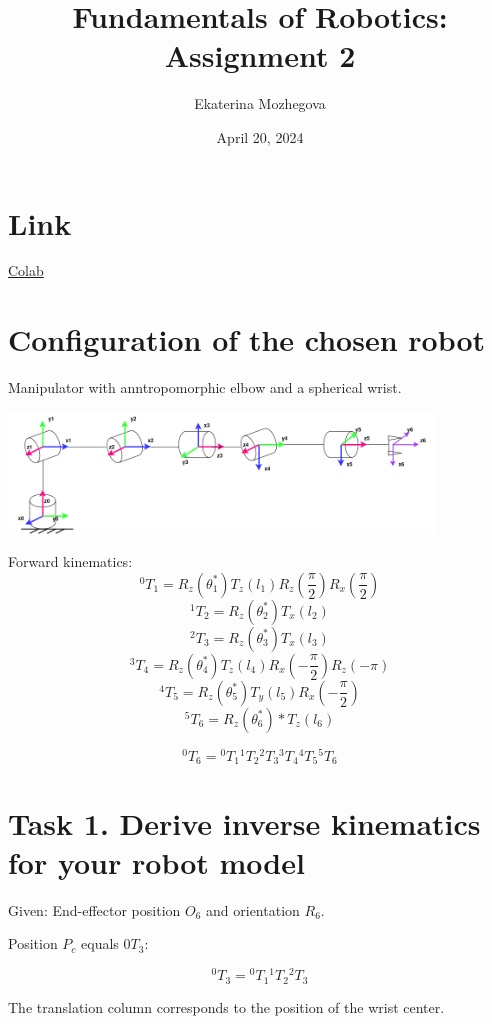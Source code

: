 \documentclass{article}
\title{Fundamentals of Robotics: Assignment 2}
\author{Ekaterina Mozhegova}
\date{April 20, 2024}
\begin{document}
\maketitle

\section{Link}

\href{https://colab.research.google.com/drive/170z2YVaeu9kHEuC4bXIWQqJ82eWDJoS2?usp=sharing}{Colab}

\section{Configuration of the chosen robot}

Manipulator with anntropomorphic elbow and a spherical wrist. 

\begin{center}
    \includegraphics*[width=0.85\textwidth]{images/new_manipulator.png}
\end{center}

Forward kinematics:
\[{}^0T_1 = R_z(\theta_1^*) T_z(l_1) R_z(\frac{\pi}{2}) R_x(\frac{\pi}{2})\]
\[{}^1T_2 = R_z(\theta_2^*) T_x(l_2) \]
\[{}^2T_3 = R_z(\theta_3^*) T_x(l_3) \]
\[{}^3T_4 = R_z(\theta_4^*) T_z(l_4) R_x(-\dfrac{\pi}{2}) R_z(-\pi)\]
\[{}^4T_5 = R_z(\theta_5^*) T_y(l_5) R_x(-\dfrac{\pi}{2})\]
\[{}^5T_6 = R_z(\theta_6^*)*T_z(l_6)\]

\[{}^0T_6 = {}^0T_1 {}^1T_2 {}^2T_3 {}^3T_4 {}^4T_5 {}^5T_6 \]

\section{Task 1. Derive inverse kinematics for your robot model}


Given:
End-effector position $O_6$ and orientation $R_6$.

Position $P_c$ equals $0T_3$:

\[{}^0T_3 = {}^0T_1 {}^1T_2 {}^2T_3\]

The translation column corresponds to the position of the wrist center. 
\end{document}
